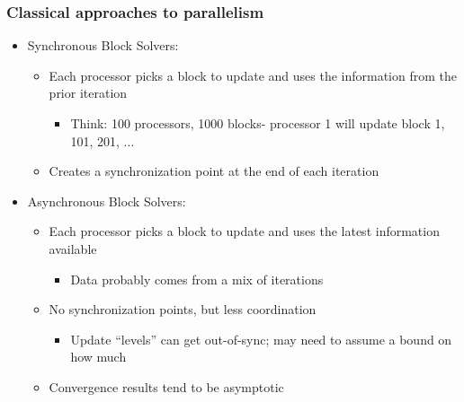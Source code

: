 \documentclass{beamer}
\begin{document}
\begin{frame}
	\frametitle{Classical approaches to parallelism}
	\begin{itemize}
		\item Synchronous Block Solvers:
			\begin{itemize}
				\item Each processor picks a block to update and uses the information from the prior iteration
					\begin{itemize}
						\item Think: 100 processors, 1000 blocks- processor 1 will update block 1, 101, 201, $\ldots$
					\end{itemize}
				\item Creates a synchronization point at the end of each iteration
			\end{itemize}
		\item Asynchronous Block Solvers:
			\begin{itemize}
				\item Each processor picks a block to update and uses the latest information available
					\begin{itemize}
						\item Data probably comes from a mix of iterations
					\end{itemize}
				\item No synchronization points, but less coordination
					\begin{itemize}
						\item Update ``levels'' can get out-of-sync; may need to assume a bound on how much
					\end{itemize}
				\item Convergence results tend to be asymptotic
			\end{itemize}
	\end{itemize}
\end{frame}
\end{document}
